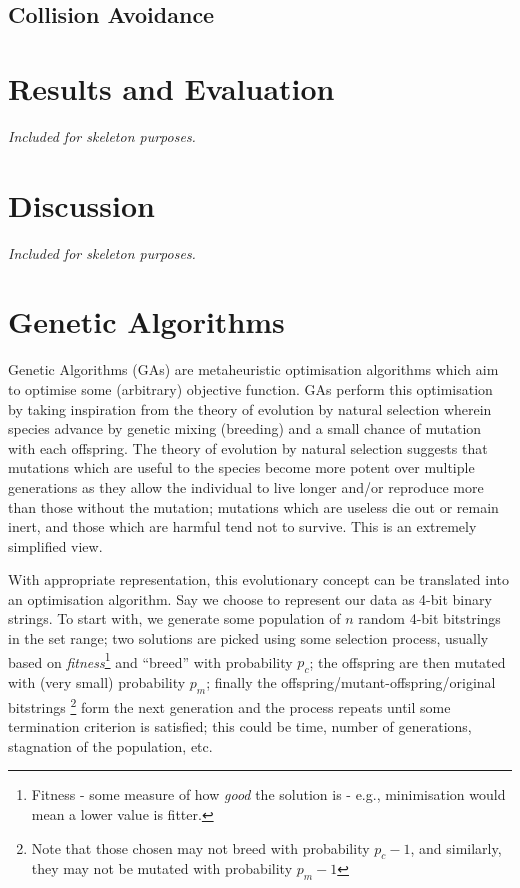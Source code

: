 \documentclass[a4paper,11pt,twoside,openright]{article}
\let\oldsection\section
\def\section{\cleardoublepage\oldsection}
\begin{document}
\subsection{Collision Avoidance}


\newpage

\section{ Results and Evaluation } \label{sec:results}
\textit{Included for skeleton purposes.}
\newpage

\section{ Discussion }
\textit{Included for skeleton purposes.}
\newpage



\appendix
\section{Genetic Algorithms} \label{ap:ga}
Genetic Algorithms (GAs) are metaheuristic
optimisation algorithms which aim to optimise some (arbitrary) objective
function. GAs perform this optimisation by taking inspiration from the
theory of evolution by natural selection wherein species advance by genetic
mixing (breeding) and a small chance of mutation with each offspring.
The theory of evolution by natural selection suggests that mutations
which are useful to the species become more potent over multiple generations
as they allow the individual to live longer and/or reproduce more than those
without the mutation; mutations which are useless die out or remain inert, and
those which are harmful tend not to survive. This is an extremely simplified
view.
\newline
\par

With appropriate representation, this evolutionary concept can be
translated into an optimisation algorithm. Say we choose to represent our data as
4-bit binary strings. To start with, we generate some population of $n$ random
4-bit bitstrings in the set range; two solutions are picked using some selection
process, usually based on \textit{fitness}\footnote{Fitness - some measure of how
  \textit{good} the solution is - e.g., minimisation would mean a lower value is
  fitter.} and ``breed'' with probability $p_c$; the offspring are then mutated
with (very small) probability $p_m$; finally the
offspring/mutant-offspring/original bitstrings \footnote{Note that those chosen
  may not breed with probability $p_c - 1$, and
similarly, they may not be mutated with probability $p_m - 1$} form the next
generation and the process repeats until some termination criterion is satisfied;
this could be time, number of generations, stagnation of the population, etc.
\newline
\par
\end{document}
